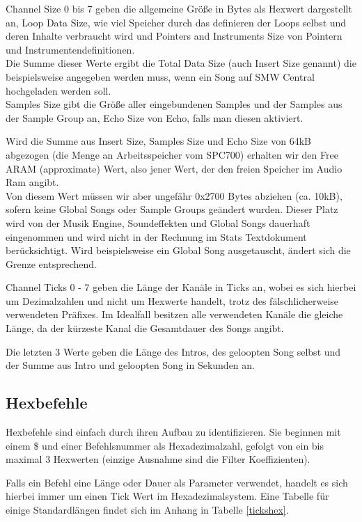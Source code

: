 Channel Size 0 bis 7 geben die allgemeine Größe in Bytes als Hexwert dargestellt an,
Loop Data Size, wie viel Speicher durch das definieren der Loops selbst und deren Inhalte verbraucht wird und Pointers and Instruments Size von Pointern und Instrumentendefinitionen. \\
Die Summe dieser Werte ergibt die Total Data Size (auch Insert Size genannt) die beispielsweise angegeben werden muss, wenn ein Song auf SMW Central hochgeladen werden soll. \\
Samples Size gibt die Größe aller eingebundenen Samples und der Samples aus der Sample Group an, Echo Size von Echo, falls man diesen aktiviert.

\bigskip

Wird die Summe aus Insert Size, Samples Size und Echo Size von 64kB abgezogen (die Menge an Arbeitsspeicher vom SPC700) erhalten wir den Free ARAM (approximate) Wert, also jener Wert, der den freien Speicher im Audio Ram angibt. \\
Von diesem Wert müssen wir aber ungefähr 0x2700 Bytes abziehen (ca. 10kB), sofern keine Global Songs oder Sample Groups geändert wurden. Dieser Platz wird von der Musik Engine, Soundeffekten und Global Songs dauerhaft eingenommen und wird nicht in der Rechnung im Stats Textdokument berücksichtigt. Wird beispielsweise ein Global Song ausgetauscht, ändert sich die Grenze entsprechend.

\bigskip

Channel Ticks 0 - 7 geben die Länge der Kanäle in Ticks an, wobei es sich hierbei um Dezimalzahlen und nicht um Hexwerte handelt, trotz des fälschlicherweise verwendeten Präfixes. Im Idealfall besitzen alle verwendeten Kanäle die gleiche Länge, da der kürzeste Kanal die Gesamtdauer des Songs angibt.

\bigskip

Die letzten 3 Werte geben die Länge des Intros, des geloopten Song selbst und der Summe aus Intro und geloopten Song in Sekunden an.

\subsection{Hexbefehle}

Hexbefehle sind einfach durch ihren Aufbau zu identifizieren. Sie beginnen mit einem \$ und einer Befehlsnummer als Hexadezimalzahl, gefolgt von ein bis maximal 3 Hexwerten (einzige Ausnahme sind die Filter Koeffizienten).
\bigskip

Falls ein Befehl eine Länge oder Dauer als Parameter verwendet, handelt es sich hierbei immer um einen Tick Wert im Hexadezimalsystem. Eine Tabelle für einige Standardlängen findet sich im Anhang in Tabelle \ref{tickshex}.

